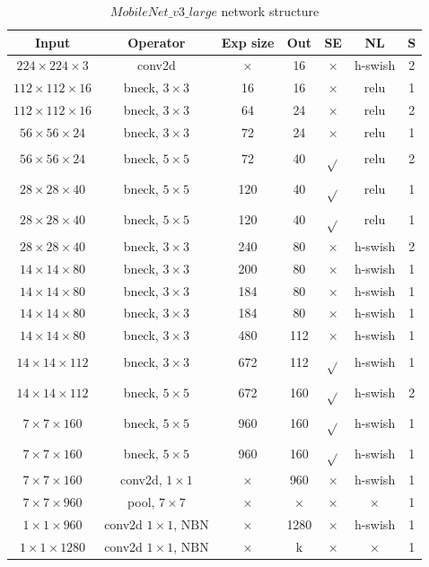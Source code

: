 \documentclass[a4paper,fleqn]{cas-sc}
\begin{document}
\begin{table}
\centering
\caption{$MobileNet\_v3\_large$ network structure}
\label{tab:mbv3}
\begin{tabular}{ccccccc}
\hline 
Input & Operator & Exp size & Out & SE & NL & S \\
\hline  
$224 \times 224 \times 3$  & conv2d &  $\times$  & 16 &  $\times$  & h-swish & 2 \\
 $112 \times 112 \times 16$  & bneck,  $3 \times 3$  & 16 & 16 &  $\times$  & relu & 1 \\
 $112 \times 112 \times 16$  & bneck,  $3 \times 3$  & 64 & 24 &  $\times$  & relu & 2 \\
 $56 \times 56 \times 24$  & bneck,  $3 \times 3$  & 72 & 24 &  $\times$  & relu & 1 \\
 $56 \times 56 \times 24$  & bneck,  $5 \times 5$  & 72 & 40 &  $\sqrt{ }$  & relu & 2 \\
 $28 \times 28 \times 40$  & bneck,  $5 \times 5$  & 120 & 40 &  $\sqrt{ }$  & relu & 1 \\
 $28 \times 28 \times 40$  & bneck,  $5 \times 5$  & 120 & 40 &  $\sqrt{ }$  & relu & 1 \\
 $28 \times 28 \times 40$  & bneck,  $3 \times 3$  & 240 & 80 &  $\times$  & h-swish & 2 \\
 $14 \times 14 \times 80$  & bneck,  $3 \times 3$  & 200 & 80 &  $\times$  & h-swish & 1 \\
 $14 \times 14 \times 80$  & bneck,  $3 \times 3$  & 184 & 80 &  $\times$  & h-swish & 1 \\
 $14 \times 14 \times 80$  & bneck,  $3 \times 3$  & 184 & 80 &  $\times$  & h-swish & 1 \\
 $14 \times 14 \times 80$  & bneck,  $3 \times 3$  & 480 & 112 &  $\times$  & h-swish & 1 \\
 $14 \times 14 \times 112$  & bneck,  $3 \times 3$  & 672 & 112 &  $\sqrt{ }$  & h-swish & 1 \\
 $14 \times 14 \times 112$  & bneck,  $5 \times 5$  & 672 & 160 &  $\sqrt{ }$ & h-swish & 2 \\
 $7 \times 7 \times 160$  & bneck,  $5 \times 5$  & 960 & 160 &  $\sqrt{ }$  & h-swish & 1 \\
 $7 \times 7 \times 160$  & bneck,  $5 \times 5$  & 960 & 160 &  $\sqrt{ }$  & h-swish & 1 \\
$7 \times 7 \times 160$  & conv2d,  $1 \times 1$  &  $\times$  & 960 &  $\times$  & h-swish & 1 \\
 $7 \times 7 \times 960$  & pool,  $7 \times 7$  &  $\times$  &  $\times$  &  $\times$  &  $\times$  & 1 \\
 $1 \times 1 \times 960$  & conv2d  $1 \times 1$, $\mathrm{NBN}$  &  $\times$  & 1280 &  $\times$  & h-swish & 1 \\
 $1 \times 1 \times 1280$  & conv2d  $1 \times 1$, $\mathrm{NBN}$  &  $\times$  &  $\mathrm{k}$  &  $\times$  &  $\times$  & 1 \\
\hline
\end{tabular}
\end{table}
\end{document}
